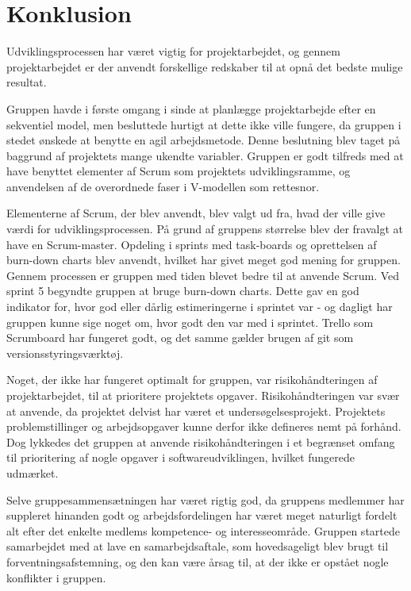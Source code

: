 \chapter{Konklusion}\label{Konklusion}
Udviklingsprocessen har været vigtig for projektarbejdet, og gennem projektarbejdet er der anvendt forskellige redskaber til at opnå det bedste mulige resultat. 

Gruppen havde i første omgang i sinde at planlægge projektarbejde efter en sekventiel model, men besluttede hurtigt at dette ikke ville fungere, da gruppen i stedet ønskede at benytte en agil arbejdsmetode. Denne beslutning blev taget på baggrund af projektets mange ukendte variabler. Gruppen er godt tilfreds med at have benyttet elementer af Scrum som projektets udviklingsramme, og anvendelsen af de overordnede faser i V-modellen som rettesnor.

Elementerne af Scrum, der blev anvendt, blev valgt ud fra, hvad der ville give værdi for udviklingsprocessen. På grund af gruppens størrelse blev der fravalgt at have en Scrum-master. Opdeling i sprints med task-boards og oprettelsen af burn-down charts blev anvendt, hvilket har givet meget god mening for gruppen. Gennem processen er gruppen med tiden blevet bedre til at anvende Scrum. Ved sprint 5 begyndte gruppen at bruge burn-down charts. Dette gav en god indikator for, hvor god eller dårlig estimeringerne i sprintet var - og dagligt har gruppen kunne sige noget om, hvor godt den var med i sprintet. Trello som Scrumboard har fungeret godt, og det samme gælder brugen af git som versionsstyringsværktøj.

Noget, der ikke har fungeret optimalt for gruppen, var risikohåndteringen af projektarbejdet, til at prioritere projektets opgaver. Risikohåndteringen var svær at anvende, da projektet delvist har været et undersøgelsesprojekt. Projektets problemstillinger og arbejdsopgaver kunne derfor ikke defineres nemt på forhånd. Dog lykkedes det gruppen at anvende risikohåndteringen i et begrænset omfang til prioritering af nogle opgaver i softwareudviklingen, hvilket fungerede udmærket. 

Selve gruppesammensætningen har været rigtig god, da gruppens medlemmer har suppleret hinanden godt og arbejdsfordelingen har været meget naturligt fordelt alt efter det enkelte medlems kompetence- og interesseområde. Gruppen startede samarbejdet med at lave en samarbejdsaftale, som hovedsageligt blev brugt til forventningsafstemning, og den kan være årsag til, at der ikke er opstået nogle konflikter i gruppen. 